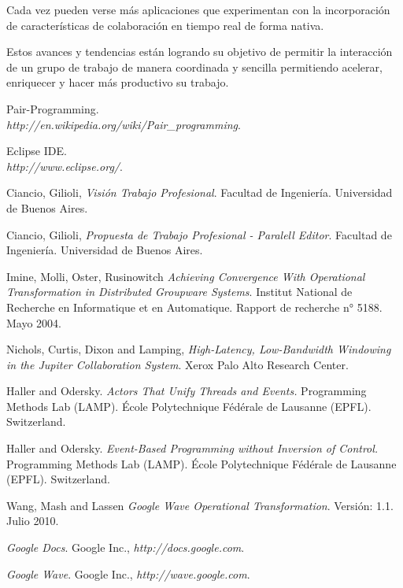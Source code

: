 \documentclass[12pt,a4paper]{article}
\begin{document}
Cada vez pueden verse más aplicaciones que experimentan con la incorporación de características de colaboración en tiempo real de
forma nativa.

Estos avances y tendencias están logrando su objetivo de permitir la interacción de un grupo de trabajo de manera coordinada y
sencilla permitiendo acelerar, enriquecer y hacer más productivo su trabajo.

\newpage
\begin{thebibliography}{9}
	Pair-Programming. \\
	\textsl{http://en.wikipedia.org/wiki/Pair\_programming}.

	Eclipse IDE. \\
	\textsl{http://www.eclipse.org/}.

	Ciancio, Gilioli,
	\emph{Visión Trabajo Profesional}.
	Facultad de Ingeniería.
	Universidad de Buenos Aires. 

	Ciancio, Gilioli,
	\emph{Propuesta de Trabajo Profesional - Paralell Editor}.
	Facultad de Ingeniería.
	Universidad de Buenos Aires. 

	Imine, Molli, Oster, Rusinowitch
	\emph{Achieving Convergence With Operational Transformation in Distributed Groupware Systems}.
	Institut National de Recherche en Informatique et en Automatique.
	Rapport de recherche n° 5188. 
	Mayo 2004.

	Nichols, Curtis, Dixon and Lamping,
	\emph{High-Latency, Low-Bandwidth Windowing in the Jupiter Collaboration System}.
	Xerox Palo Alto Research Center.

	Haller and Odersky.
	\emph{Actors That Unify Threads and Events.}
	Programming Methods Lab (LAMP).
	École Polytechnique Fédérale de Lausanne (EPFL).
	Switzerland.
 
	Haller and Odersky.
	\emph{Event-Based Programming without Inversion of Control.}
	Programming Methods Lab (LAMP).
	École Polytechnique Fédérale de Lausanne (EPFL).
	Switzerland.

	Wang, Mash and Lassen
	\emph{Google Wave Operational Transformation}.
	Versión: 1.1.
	Julio 2010.
	
	\emph{Google Docs}. 
	Google Inc., 
	\textsl{http://docs.google.com}.
	
	\emph{Google Wave}. Google Inc., 
	\textsl{http://wave.google.com}.


\end{thebibliography}
\end{document}
